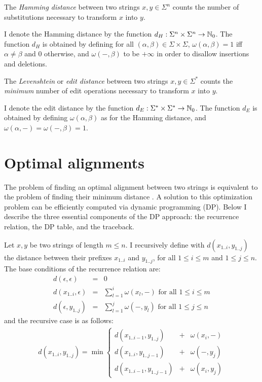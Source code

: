 \begin{definition}
\label{def:hamming}
The \emph{Hamming distance} between two strings $x,y \in \Sigma^{n}$ counts the number of substitutions necessary to transform $x$ into $y$.
\end{definition}
I denote the Hamming distance by the function $d_H : \Sigma^{n} \times \Sigma^{n} \rightarrow \mathbb {N}_0$.
The function $d_H$ is obtained by defining for all $(\alpha,\beta) \in \Sigma \times \Sigma$, $\omega(\alpha,\beta) = 1$ iff $\alpha \neq \beta$ and 0 otherwise, and $\omega(-,\beta)$ to be $+ \infty$ in order to disallow insertions and deletions.

\begin{definition}
\label{def:edit}
The \emph{Levenshtein} or \emph{edit distance} between two strings $x,y \in \Sigma^{*}$ counts the \emph{minimum} number of edit operations necessary to transform $x$ into $y$.
\end{definition}
I denote the edit distance by the function $d_E : \Sigma^{*} \times \Sigma^{*} \rightarrow \mathbb {N}_0$.
The function $d_E$ is obtained by defining $\omega(\alpha,\beta)$ as for the Hamming distance, and $\omega(\alpha,-) = \omega(-,\beta) = 1$.

\section{Optimal alignments}

The problem of finding an optimal alignment between two strings is equivalent to the problem of finding their minimum distance \citep{Gusfield1997}.
A solution to this optimization problem can be efficiently computed via dynamic programming (DP).
Below I describe the three essential components of the DP approach: the recurrence relation, the DP table, and the traceback.

Let $x,y$ be two strings of length $m \leq n$.
I recursively define with $d(x_{1..i},y_{1..j})$ the distance between their prefixes $x_{1..i}$ and $y_{1..j}$, for all $1 \leq i \leq m$ and $1 \leq j \leq n$.
The base conditions of the recurrence relation are:
\begin{eqnarray}
d(\epsilon,\epsilon)&=&0\\
d(x_{1..i},\epsilon)&=&\sum_{l=1}^{i}{\omega(x_l, -)} \text{ for all } 1 \leq i \leq m\\
d(\epsilon, y_{1..j})&=&\sum_{l=1}^{j}{\omega(-, y_l)} \text{ for all } 1 \leq j \leq n
\end{eqnarray}
and the recursive case is as follows:
\begin{eqnarray}
d(x_{1..i},y_{1..j}) = \min \left\{
\begin{array}{lcl}
d(x_{1..i-1},y_{1..j})&+&\omega(x_i, -)\\
d(x_{1..i},y_{1..j-1})&+&\omega(-, y_j)\\
d(x_{1..i-1},y_{1..j-1})&+&\omega(x_i, y_j)
\end{array}
\right.\label{eq:dp-min}
\end{eqnarray}

